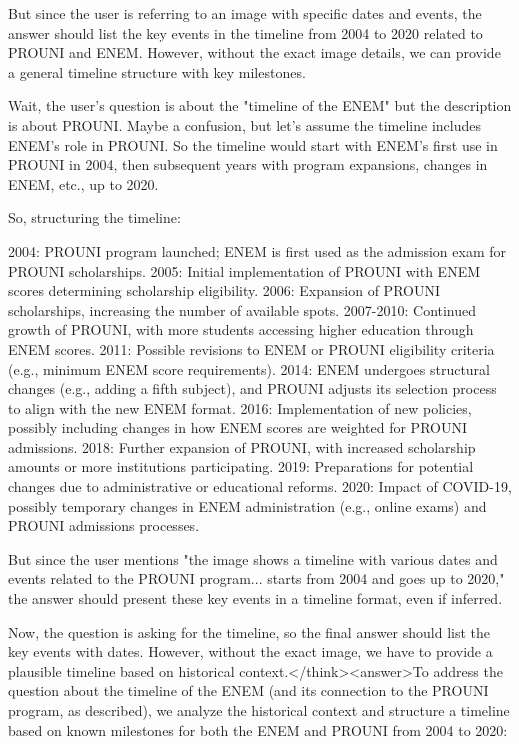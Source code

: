 But since the user is referring to an image with specific dates and events, the answer should list the key events in the timeline from 2004 to 2020 related to PROUNI and ENEM. However, without the exact image details, we can provide a general timeline structure with key milestones.

Wait, the user's question is about the "timeline of the ENEM" but the description is about PROUNI. Maybe a confusion, but let's assume the timeline includes ENEM's role in PROUNI. So the timeline would start with ENEM's first use in PROUNI in 2004, then subsequent years with program expansions, changes in ENEM, etc., up to 2020.

So, structuring the timeline:

2004: PROUNI program launched; ENEM is first used as the admission exam for PROUNI scholarships.
2005: Initial implementation of PROUNI with ENEM scores determining scholarship eligibility.
2006: Expansion of PROUNI scholarships, increasing the number of available spots.
2007-2010: Continued growth of PROUNI, with more students accessing higher education through ENEM scores.
2011: Possible revisions to ENEM or PROUNI eligibility criteria (e.g., minimum ENEM score requirements).
2014: ENEM undergoes structural changes (e.g., adding a fifth subject), and PROUNI adjusts its selection process to align with the new ENEM format.
2016: Implementation of new policies, possibly including changes in how ENEM scores are weighted for PROUNI admissions.
2018: Further expansion of PROUNI, with increased scholarship amounts or more institutions participating.
2019: Preparations for potential changes due to administrative or educational reforms.
2020: Impact of COVID-19, possibly temporary changes in ENEM administration (e.g., online exams) and PROUNI admissions processes.

But since the user mentions "the image shows a timeline with various dates and events related to the PROUNI program... starts from 2004 and goes up to 2020," the answer should present these key events in a timeline format, even if inferred.

Now, the question is asking for the timeline, so the final answer should list the key events with dates. However, without the exact image, we have to provide a plausible timeline based on historical context.</think><answer>To address the question about the timeline of the ENEM (and its connection to the PROUNI program, as described), we analyze the historical context and structure a timeline based on known milestones for both the ENEM and PROUNI from 2004 to 2020:  


